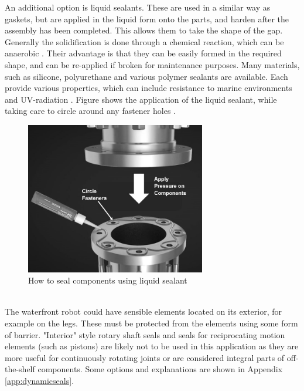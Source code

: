 An additional option is liquid sealants. These are used in a similar way as gaskets, but are applied in the liquid form onto the parts, and harden after the assembly has been completed. This allows them to take the shape of the gap. Generally the solidification is done through a chemical reaction, which can be anaerobic \cite{henkel_improving_nodate}. Their advantage is that they can be easily formed in the required shape, and can be re-applied if broken for maintenance purposes. Many materials, such as silicone, polyurethane and various polymer sealants are available. Each provide various properties, which can include resistance to marine environments and UV-radiation \cite{3m_sealants_nodate}. Figure shows the application of the liquid sealant, while taking care to circle around any fastener holes \cite{henkel_improving_nodate}.

\begin{figure}[H]
    \centering
    \includegraphics[width=0.7\textwidth]{Sections/LiteratureReview/img/seals/seal_liquid.JPG}
    \caption{How to seal components using liquid sealant \cite{henkel_improving_nodate}}
    \label{fig:seal_liquid}
\end{figure}




 \mbox{}\\

The waterfront robot could have sensible elements located on its exterior, for example on the legs. These must be protected from the elements using some form of barrier. "Interior" style rotary shaft seals and seals for reciprocating motion elements (such as pistons) are likely not to be used in this application as they are more useful for continuously rotating joints or are considered integral parts of off-the-shelf components. Some options and explanations are shown in Appendix \ref{app:dynamicseals}. 

